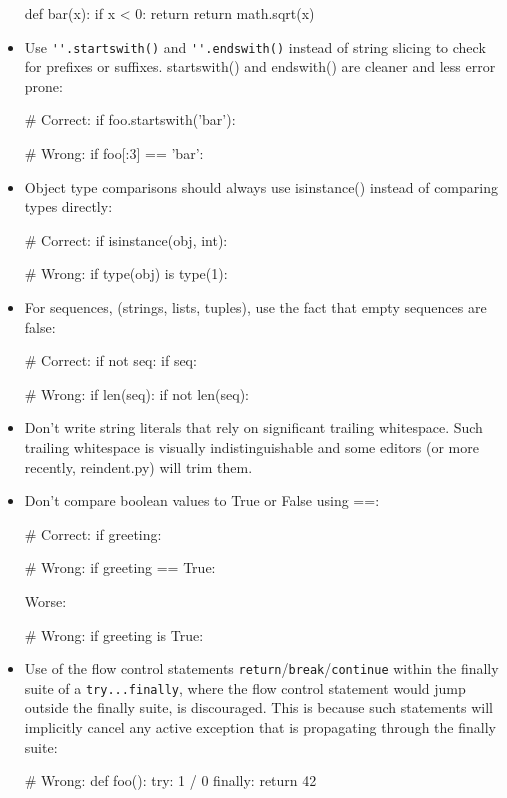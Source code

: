 \documentclass[a4paper,11pt]{article}
\begin{document}
\begin{itemize}
\begin{python}
def bar(x):
    if x < 0:
        return
    return math.sqrt(x)
\end{python}
\item Use \verb!''.startswith()! and \verb!''.endswith()! instead of string 
slicing to check for prefixes or suffixes. startswith() and endswith() are 
cleaner and less error prone:
\begin{python}
# Correct:
if foo.startswith('bar'):
\end{python}
\begin{python}
# Wrong:
if foo[:3] == 'bar':
\end{python}
\item Object type comparisons should always use isinstance() instead of 
comparing types directly:
\begin{python}
# Correct:
if isinstance(obj, int):
\end{python}
\begin{python}
# Wrong:
if type(obj) is type(1):
\end{python}
\item For sequences, (strings, lists, tuples), use the fact that empty 
sequences are false:
\begin{python}
# Correct:
if not seq:
if seq:
\end{python}
\begin{python}
# Wrong:
if len(seq):
if not len(seq):
\end{python}
\item Don’t write string literals that rely on significant trailing 
whitespace. Such trailing whitespace is visually indistinguishable and some 
editors (or more recently, reindent.py) will trim them.
\item Don’t compare boolean values to True or False using ==:
\begin{python}
# Correct:
if greeting:
\end{python}
\begin{python}
# Wrong:
if greeting == True:
\end{python}
Worse:
\begin{python}
# Wrong:
if greeting is True:
\end{python}
\item Use of the flow control statements 
\verb"return"/\verb"break"/\verb"continue" within the finally suite of a 
\verb"try...finally", where the flow control statement would jump outside the 
finally suite, is discouraged. This is because such statements will 
implicitly cancel any active exception that is propagating through the 
finally suite:
\begin{python}
# Wrong:
def foo():
    try:
        1 / 0
    finally:
        return 42
\end{python}
\end{itemize}
\end{document}
